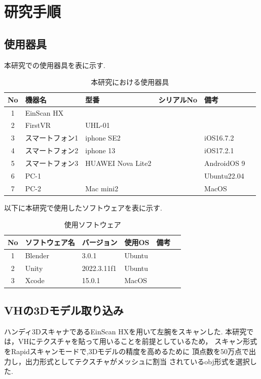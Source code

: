 \documentclass{ltjsreport}
\begin{document}
\chapter{研究手順}
	\section{使用器具}
		本研究での使用器具を表に示す.
	\begin{table}[H]
	\begin{center}
	\caption{本研究における使用器具}
	\label{tab:usedev}
	\begin{tabular}{clllll} \toprule
	No&\multicolumn{1}{l}{機器名}&\multicolumn{1}{l}{型番}&\multicolumn{1}{l}{シリアルNo}&\multicolumn{1}{l}{備考}\\ \hline
	1&EinScan HX&&&\\
	2&FirstVR&UHL-01&&\\
	3&スマートフォン1&iphone SE2&&iOS16.7.2\\
	4&スマートフォン2&iphone 13&&iOS17.2.1\\
	5&スマートフォン3&HUAWEI Nova Lite2&&AndroidOS 9\\
	6&PC-1&&&Ubuntu22.04\\
	7&PC-2&Mac mini2&&MacOS\\
	\bottomrule
	\end{tabular}
	\end{center}
	\end{table}
	以下に本研究で使用したソフトウェアを表に示す.
	\begin{table}[H]
	\begin{center}
	\caption{使用ソフトウェア}
	\label{tab:usesoft}
	\begin{tabular}{clllll} \toprule
	No&\multicolumn{1}{l}{ソフトウェア名}&\multicolumn{1}{l}{バージョン}&\multicolumn{1}{l}{使用OS}&\multicolumn{1}{l}{備考}\\ \hline
	1&Blender&3.0.1&Ubuntu&\\
	2&Unity&2022.3.11f1&Ubuntu&\\
	3&Xcode&15.0.1&MacOS&\\
	\bottomrule
	\end{tabular}
	\end{center}
	\end{table}
	\section{VHの3Dモデル取り込み}
		ハンディ3DスキャナであるEinScan HXを用いて左腕をスキャンした.
		本研究では，VHにテクスチャを貼って用いることを前提としているため，
		スキャン形式をRapidスキャンモードで,3Dモデルの精度を高めるために
		頂点数を50万点で出力し，出力形式としてテクスチャがメッシュに割当
		されているobj形式を選択した.
\end{document}
